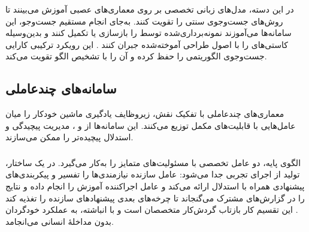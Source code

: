\subsubsection{\protect{}}
در این دسته، مدل‌های زبانی تخصصی بر روی معماری‌های عصبی  آموزش می‌بینند تا روش‌های جست‌وجوی سنتی را تقویت کنند. به‌جای انجام مستقیم جست‌وجو، این سامانه‌ها می‌آموزند  نمونه‌برداری‌شده توسط  را بازسازی یا تکمیل کنند و بدین‌وسیله کاستی‌های  را با اصول طراحی آموخته‌شده جبران کنند \cite{Yu2025GPTNAS}. این رویکرد ترکیبی کارایی جست‌وجوی الگوریتمی را حفظ کرده و آن را با تشخیص الگو تقویت می‌کند.

\subsection{سامانه‌های چندعاملی}

معماری‌های چندعاملی با تفکیک نقش، زیروظایف یادگیری ماشین خودکار را میان عامل‌هایی با قابلیت‌های مکمل توزیع می‌کنند. این سامانه‌ها از  و ، مدیریت پیچیدگی و استدلال پیچیده‌تر را ممکن می‌سازند.

\subsubsection{\protect{}}
الگوی پایه، دو عامل تخصصی با مسئولیت‌های متمایز را به‌کار می‌گیرد. در یک ساختار، تولید  از اجرای تجربی جدا می‌شود: عامل سازنده نیازمندی‌ها را تفسیر و پیکربندی‌های پیشنهادی همراه با استدلال ارائه می‌کند و عامل اجراکننده آموزش را انجام داده و نتایج را در گزارش‌های مشترک می‌گنجاند تا چرخه‌های بعدی پیشنهادهای سازنده را تغذیه کند \cite{liu2025agenthpo}. این تقسیم کار بازتاب گردش‌کار متخصصان است و با  انباشته، به عملکرد خودگردان بدون مداخلهٔ انسانی می‌انجامد.

